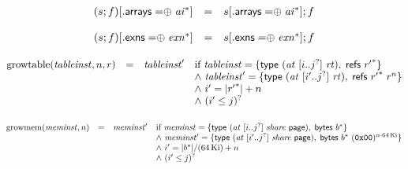 $$
\begin{array}[t]{@{}lcl@{}l@{}}
(s ; f){}[{.}\mathsf{arrays} \mathrel{{=}{\oplus}} {{\mathit{ai}}^\ast}] & = & s{}[{.}\mathsf{arrays} \mathrel{{=}{\oplus}} {{\mathit{ai}}^\ast}] ; f \\
\end{array}
$$

$$
\begin{array}[t]{@{}lcl@{}l@{}}
(s ; f){}[{.}\mathsf{exns} \mathrel{{=}{\oplus}} {{\mathit{exn}}^\ast}] & = & s{}[{.}\mathsf{exns} \mathrel{{=}{\oplus}} {{\mathit{exn}}^\ast}] ; f \\
\end{array}
$$

\vspace{1ex}

$$
\begin{array}[t]{@{}lcl@{}l@{}}
{\mathrm{growtable}}({\mathit{tableinst}}, n, r) & = & {\mathit{tableinst}'} & \quad
\begin{array}[t]{@{}l@{}}
\mbox{if}~ {\mathit{tableinst}} = \{ \mathsf{type}~({\mathit{at}}~{}[ i .. {j^?} ]~{\mathit{rt}}),\; \mathsf{refs}~{{r'}^\ast} \} \\
{\land}~ {\mathit{tableinst}'} = \{ \mathsf{type}~({\mathit{at}}~{}[ {i'} .. {j^?} ]~{\mathit{rt}}),\; \mathsf{refs}~{{r'}^\ast}~{r^{n}} \} \\
{\land}~ {i'} = {|{{r'}^\ast}|} + n \\
{\land}~ ({i'} \leq j)^? \\
\end{array} \\
\end{array}
$$

$$
\begin{array}[t]{@{}lcl@{}l@{}}
{\mathrm{growmem}}({\mathit{meminst}}, n) & = & {\mathit{meminst}'} & \quad
\begin{array}[t]{@{}l@{}}
\mbox{if}~ {\mathit{meminst}} = \{ \mathsf{type}~({\mathit{at}}~{}[ i .. {j^?} ]~{\mathit{share}}~\mathsf{page}),\; \mathsf{bytes}~{b^\ast} \} \\
{\land}~ {\mathit{meminst}'} = \{ \mathsf{type}~({\mathit{at}}~{}[ {i'} .. {j^?} ]~{\mathit{share}}~\mathsf{page}),\; \mathsf{bytes}~{b^\ast}~{(\mathtt{0x00})^{n \cdot 64 \, {\mathrm{Ki}}}} \} \\
{\land}~ {i'} = {|{b^\ast}|} / (64 \, {\mathrm{Ki}}) + n \\
{\land}~ ({i'} \leq j)^? \\
\end{array} \\
\end{array}
$$

